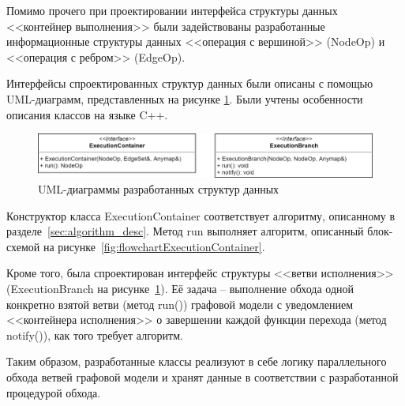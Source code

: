 Помимо прочего при проектировании интерфейса структуры данных <<контейнер выполнения>> были задействованы разработанные информационные структуры данных <<операция с вершиной>> (\textsf{NodeOp}) и <<операция с ребром>> (\textsf{EdgeOp}).

Интерфейсы спроектированных структур данных были описаны с помощью UML-диаграмм, представленных на рисунке \ref{fig:UMLAll}. Были учтены особенности описания классов на языке C++.
\begin{figure}[!ht]
    \centering
    \includegraphics[width=\textwidth]{figures/UML.all.png}
    \caption{UML-диаграммы разработанных структур данных}
    \label{fig:UMLAll}
\end{figure}

Конструктор класса \textsf{ExecutionContainer} соответствует алгоритму, описанному в разделе~\ref{sec:algorithm_desc}. Метод run выполняет алгоритм, описанный блок-схемой на рисунке~\ref{fig:flowchartExecutionContainer}.

Кроме того, была спроектирован интерфейс структуры <<ветви исполнения>> (\textsf{ExecutionBranch} на рисунке~\ref{fig:UMLAll}). Её задача -- выполнение обхода одной конкретно взятой ветви (метод \textsf{run()}) графовой модели с уведомлением <<контейнера исполнения>> о завершении каждой функции перехода (метод \textsf{notify()}), как того требует алгоритм.

Таким образом, разработанные классы реализуют в себе логику параллельного обхода ветвей графовой модели и хранят данные в соответствии с разработанной процедурой обхода.

